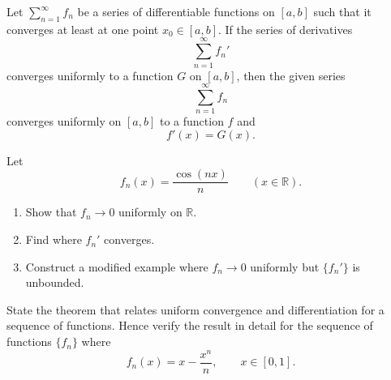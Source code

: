 \documentclass[12pt, a4paper]{article}
\begin{document}
\clearpage

\begin{theorem}
Let $\sum_{n=1}^{\infty} f_n$ be a series of differentiable functions on $[a,b]$
such that it converges at least at one point $x_0\in [a,b]$.
If the series of derivatives
\[
\sum_{n=1}^{\infty} f_n'
\]
converges uniformly to a function $G$ on $[a,b]$, then the given series
\[
\sum_{n=1}^{\infty} f_n
\]
converges uniformly on $[a,b]$ to a function $f$ and
\[
f'(x)=G(x).
\]
\end{theorem}

\clearpage

\begin{problem}
Let
\[
f_n(x)=\frac{\cos(nx)}{n}\qquad (x\in\mathbb{R}).
\]
\begin{enumerate}
    \item Show that $f_n\to 0$ uniformly on $\mathbb{R}$.
    \item Find where $f_n'$ converges.
    \item Construct a modified example where $f_n\to 0$ uniformly but $\{f_n'\}$ is unbounded.
\end{enumerate}
\end{problem}

\clearpage

\begin{problem}
State the theorem that relates uniform convergence and differentiation for a sequence of
functions. Hence verify the result in detail for the sequence of functions $\{f_n\}$ where
\[
f_n(x)=x-\frac{x^n}{n},\qquad x\in[0,1].
\]
\end{problem}



\EndPage
\end{document}

